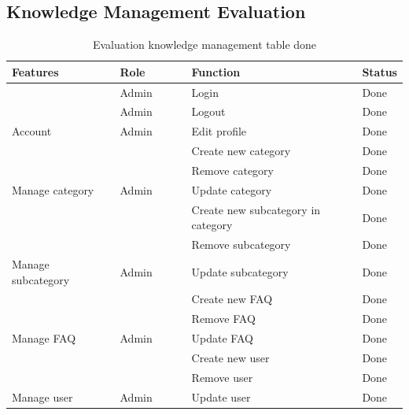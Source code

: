 \documentclass[12pt,oneside,openright,a4paper]{cpe-english-project}
\begin{document}
	\subsection{Knowledge Management Evaluation}
	\begin{table}[h]
		\caption{Evaluation knowledge management table done}
		\label{tab:Evaluation knowledge management table done}
	\begin{adjustbox}{width=\textwidth}
	\begin{tabular}{|p{0.3\linewidth}|p{0.2\linewidth}|p{0.5\linewidth}|p{0.1\linewidth}|}
	\hline
	\rowcolor[HTML]{C9DAF8} 
	Features                             & Role                    & Function                           & Status \\ \hline
										 & Admin                   & Login                              & Done   \\ \cline{2-4} 
										 & Admin                   & Logout                             & Done   \\ \cline{2-4} 
	\multirow{-3}{*}{Account}            & Admin                   & Edit profile                       & Done   \\ \hline
										 &                         & Create new category                & Done   \\ \cline{3-4} 
										 &                         & Remove category                    & Done   \\ \cline{3-4} 
	\multirow{-3}{*}{Manage category}    & \multirow{-3}{*}{Admin} & Update category                    & Done   \\ \hline
										 &                         & Create new subcategory in category & Done   \\ \cline{3-4} 
										 &                         & Remove subcategory                 & Done   \\ \cline{3-4} 
	\multirow{-3}{*}{Manage subcategory} & \multirow{-3}{*}{Admin} & Update subcategory                 & Done   \\ \hline
										 &                         & Create new FAQ                     & Done   \\ \cline{3-4} 
										 &                         & Remove FAQ                         & Done   \\ \cline{3-4} 
	\multirow{-3}{*}{Manage FAQ}         & \multirow{-3}{*}{Admin} & Update FAQ                         & Done   \\ \hline
										 &                         & Create new user                    & Done   \\ \cline{3-4} 
										 &                         & Remove user                        & Done   \\ \cline{3-4} 
	\multirow{-3}{*}{Manage   user}      & \multirow{-3}{*}{Admin} & Update user                        & Done   \\ \hline
	\end{tabular}
	\end{adjustbox}
	\end{table}
\end{document}
